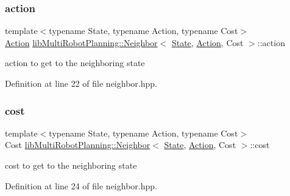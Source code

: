 \subsubsection{\texorpdfstring{action}{action}}
{\footnotesize\ttfamily template$<$typename State, typename Action, typename Cost$>$ \\
\hyperlink{namespacelib_multi_robot_planning_aba73fb71693f86a324adfa0e41e1053d}{Action} \hyperlink{structlib_multi_robot_planning_1_1_neighbor}{lib\+Multi\+Robot\+Planning\+::\+Neighbor}$<$ \hyperlink{structlib_multi_robot_planning_1_1_state}{State}, \hyperlink{namespacelib_multi_robot_planning_aba73fb71693f86a324adfa0e41e1053d}{Action}, Cost $>$\+::action}



action to get to the neighboring state 



Definition at line 22 of file neighbor.\+hpp.

\mbox{\label{structlib_multi_robot_planning_1_1_neighbor_af269be36c1200896a5990f7ee3d9da27}} 
\subsubsection{\texorpdfstring{cost}{cost}}
{\footnotesize\ttfamily template$<$typename State, typename Action, typename Cost$>$ \\
Cost \hyperlink{structlib_multi_robot_planning_1_1_neighbor}{lib\+Multi\+Robot\+Planning\+::\+Neighbor}$<$ \hyperlink{structlib_multi_robot_planning_1_1_state}{State}, \hyperlink{namespacelib_multi_robot_planning_aba73fb71693f86a324adfa0e41e1053d}{Action}, Cost $>$\+::cost}



cost to get to the neighboring state 



Definition at line 24 of file neighbor.\+hpp.

\mbox{\label{structlib_multi_robot_planning_1_1_neighbor_ad4930766ec86e82ae342ffe94f5e0da4}} 
